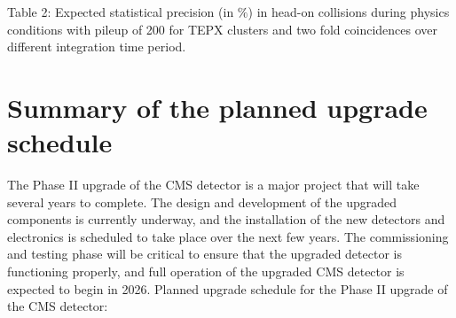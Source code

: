 \begin{flushleft} 
  Table 2: Expected statistical precision (in $\%$) in head-on collisions during physics conditions with pileup of 200 for TEPX clusters and two fold coincidences over different integration time period.
  \end{flushleft} 
\begin{center}
\end{center}


\section{Summary of the planned upgrade schedule}

The Phase II upgrade of the CMS detector is a major project that will take several years to complete. The design and development of the upgraded components is currently underway, and the installation of the new detectors and electronics is scheduled to take place over the next few years. The commissioning and testing phase will be critical to ensure that the upgraded detector is functioning properly, and full operation of the upgraded CMS detector is expected to begin in 2026. Planned upgrade schedule for the Phase II upgrade of the CMS detector:

